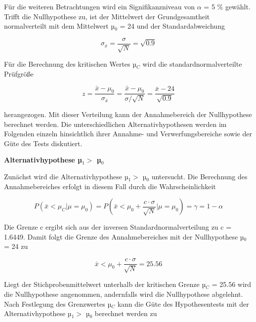 \noindent F\"{u}r die weiteren Betrachtungen wird ein Signifikanzniveau von $\alpha$ = 5 \% gew\"{a}hlt. Trifft die Nullhypothese zu, ist der Mittelwert der Grundgesamtheit normalverteilt mit dem Mittelwert µ$_{0}$ = 24 und der Standardabweichung 

\begin{equation}\label{eq:sixsixtytwo}
\sigma _{\bar{x}} =\dfrac{\sigma}{\sqrt{N}} =\sqrt{0.9}
\end{equation}

\noindent F\"{u}r die Berechnung des kritischen Wertes µ$_{C}$ wird die standardnormalverteilte Pr\"{u}fgr\"{o}{\ss}e 

\begin{equation}\label{eq:sixsixtythree}
z=\dfrac{\bar{x}-\mu _{0}}{\sigma _{\bar{x}}} =\dfrac{\bar{x}-\mu _{0}}{\sigma /\sqrt{N}} =\dfrac{\bar{x}-24}{\sqrt{0.9}}
\end{equation}

\noindent herangezogen. Mit dieser Verteilung kann der Annahmebereich der Nullhypothese berechnet werden. Die unterschiedlichen Alternativhypothesen werden im Folgenden einzeln hinsichtlich ihrer Annahme- und Verwerfungsbereiche sowie der G\"{u}te des Tests diskutiert.

\clearpage

{\selectfont
\noindent\textbf{Alternativhypothese µ$_{1} >$ µ$_{0}$}}\smallskip

\noindent Zun\"{a}chst wird die Alternativhypothese µ${}_{1}  \boldsymbol > $ µ${}_{0}$ untersucht. Die Berechnung des Annahmebereiches erfolgt in diesem Fall durch die Wahrscheinlichkeit 

\begin{equation}\label{eq:sixsixtyfour}
P\left(\bar{x}<\mu _{C} |\mu =\mu _{0} \right)=P\left(\bar{x}<\mu _{0} +\dfrac{c\cdot \sigma }{\sqrt{N} } |\mu =\mu _{0} \right)=\gamma =1-\alpha
\end{equation}

\noindent Die Grenze c ergibt sich aus der inversen Standardnormalverteilung zu c = 1.6449. Damit folgt die Grenze des Annahmebereiches mit der Nullhypothese µ$_{0}$ = 24 zu

\begin{equation}\label{eq:sixsixtyfive}
\bar{x}<\mu _{0} +\dfrac{c\cdot \sigma }{\sqrt{N} } =25.56
\end{equation}

Liegt der Stichprobenmittelwert unterhalb der kritischen Grenze µ$_{C}$ = 25.56 wird die Nullhypothese angenommen, andernfalls wird die Nullhypothese abgelehnt. Nach Festlegung des Grenzwertes µ$_{C}$ kann die G\"{u}te des Hypothesentests mit der Alternativhypothese µ$_{1} > $ µ$_{0}$ berechnet werden zu

